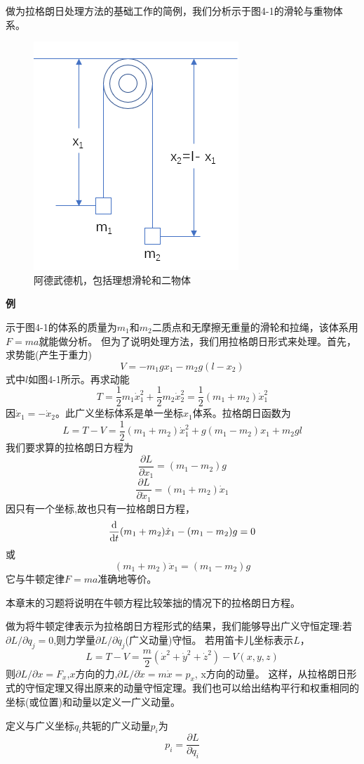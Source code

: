 做为拉格朗日处理方法的基础工作的简例，我们分析示于图4-1的滑轮与重物体系。

\begin{figure}[htbp]
    \centering
    \includegraphics[scale=0.6]{./fig/4-1.png}
    \caption{阿德武德机，包括理想滑轮和二物体}
\end{figure}

\textbf{例}

示于图4-1的体系的质量为$m_1$和$m_2$二质点和无摩擦无重量的滑轮和拉绳，该体系用$F=ma$就能做分析。
但为了说明处理方法，我们用拉格朗日形式来处理。首先，求势能(产生于重力)
\[V=-m_1gx_1-m_2g(l-x_2)\]
式中$l$如图4-1所示。再求动能
\[T=\frac{1}{2}m_1\dot{x}_1^2+\frac{1}{2}m_2\dot{x}_2^2=\frac{1}{2}(m_1+m_2)\dot{x}_1^2\]
因$\dot{x}_1=-\dot{x}_2$。此广义坐标体系是单一坐标$x_1$体系。拉格朗日函数为
\[L=T-V=\frac{1}{2}(m_1+m_2)\dot{x}_1^2+g(m_1-m_2)x_1+m_2gl\]
我们要求算的拉格朗日方程为
\[\frac{\partial L}{\partial x_1}=(m_1-m_2)g\]
\[\frac{\partial L}{\partial \dot{x}_1}=(m_1+m_2)\dot{x}_1\]
因只有一个坐标,故也只有一拉格朗日方程，
\[\dv{t}(m_1+m_2)\dot{x}_1-(m_1-m_2)g=0\]
或
\[(m_1+m_2)\ddot{x}_1=(m_1-m_2)g\]
它与牛顿定律$F=ma$准确地等价。

本章末的习题将说明在牛顿方程比较笨拙的情况下的拉格朗日方程。

做为将牛顿定律表示为拉格朗日方程形式的结果，我们能够导出广义守恒定理:若$\partial L/\partial q_j=0$,则力学量$\partial L/\partial \dot{q_j}$(广义动量)守恒。
若用笛卡儿坐标表示$L$，
\[L=T-V=\frac{m}{2}(\dot{x}^2+\dot{y}^2+\dot{z}^2)-V(x,y,z) \tag{4-32}\]
则$\partial L/\partial x=F_x$,$x$方向的力,$\partial L/\partial \dot{x}=m\dot{x}=p_x$, x方向的动量。
这样，从拉格朗日形式的守恒定理又得出原来的动量守恒定理。我们也可以给出结构平行和权重相同的坐标(或位置)和动量以定义一广义动量。
\begin{definition}[广义动量]
    定义与广义坐标$q_i$共轭的广义动量$p_i$为
    \[p_i=\frac{\partial L}{\partial \dot{q}_i} \tag{4-33}\]
\end{definition}

